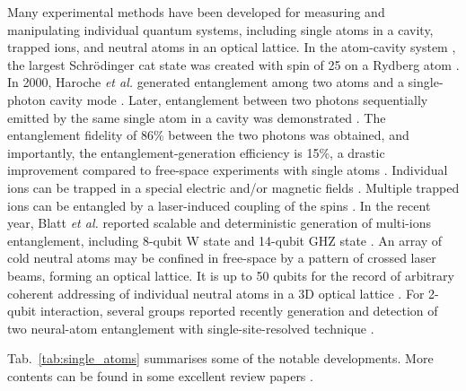 Many experimental methods have been developed for measuring and manipulating individual quantum systems, including single atoms in a cavity, trapped ions, and neutral atoms in an optical lattice. In the atom-cavity system \cite{bib:haroche2006exploring}, the largest Schr{\"o}dinger cat state was created with spin of 25 on a Rydberg atom \cite{bib:facon2016sensitive}. In 2000, Haroche \textit{et al.} generated entanglement among two atoms and a single-photon cavity mode \cite{bib:rauschenbeutel2000step}. Later, entanglement between two photons sequentially emitted by the same single atom in a cavity was demonstrated \cite{bib:wilk2007single}. The entanglement fidelity of 86\% between the two photons was obtained, and importantly, the entanglement-generation efficiency is 15\%, a drastic improvement compared to free-space experiments with single atoms \cite{bib:blinov2004observation}. Individual ions can be trapped in a special electric and/or magnetic fields \cite{bib:leibfried2003quantum}. Multiple trapped ions can be entangled by a laser-induced coupling of the spins \cite{bib:blatt2008entangled}. In the recent year, Blatt \textit{et al.} reported scalable and deterministic generation of multi-ions entanglement, including 8-qubit W state \cite{bib:haffner2005scalable} and 14-qubit GHZ state \cite{bib:monz2011}. An array of cold neutral atoms may be confined in free-space by a pattern of crossed laser beams, forming an optical lattice. It is up to 50 qubits for the record of arbitrary coherent addressing of individual neutral atoms in a 3D optical lattice \cite{bib:wang2015coherent}. For 2-qubit interaction, several groups reported recently generation and detection of two neural-atom entanglement with single-site-resolved technique \cite{bib:kaufman2015entangling, bib:islam2015measuring, bib:dai2016generation}.

Tab.~\ref{tab:single_atoms} summarises some of the notable developments. More contents can be found in some excellent review papers \cite{bib:blatt2008entangled, bib:haroche2006exploring, bib:leibfried2003quantum}.

